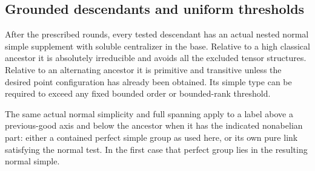 \subsection{Grounded descendants and uniform thresholds}
\begin{proposition}
\label{fb:grounding}
After the prescribed rounds, every tested descendant has an actual nested
normal simple supplement with soluble centralizer in the base.  Relative to a
high classical ancestor it is absolutely irreducible and avoids all the
excluded tensor structures.  Relative to an alternating ancestor it is
primitive and transitive unless the desired point configuration has already
been obtained.  Its simple type can be required to exceed any fixed bounded
order or bounded-rank threshold.

The same actual normal simplicity and full spanning apply to a label above a
previous-good axis and below the ancestor when it has the indicated
nonabelian part: either a contained perfect simple group as used here, or its
own pure link satisfying the normal test.  In the first case that perfect
group lies in the resulting normal simple.
\end{proposition}
